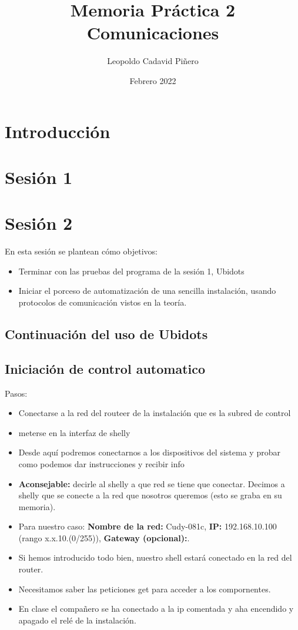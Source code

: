 \documentclass[12pt, a4paper]{article}
\title{Memoria Práctica 2 \\


\large Comunicaciones
}
\author{
Leopoldo Cadavid Piñero
}
\date{Febrero 2022}
\begin{document}
\maketitle
\newpage
\tableofcontents
\newpage
\section{Introducción}
      

\section{Sesión 1}

\section{Sesión 2}
 En esta sesión se plantean cómo objetivos:
 \begin{itemize}
     \item Terminar con las pruebas del programa de la sesión 1, Ubidots
     \item Iniciar el porceso de automatización de una sencilla instalación, usando protocolos de 
        comunicación vistos en la teoría.
    
    
    \end{itemize}

    \subsection{Continuación del uso de Ubidots}

\subsection{Iniciación de control automatico}

Pasos:
\begin{itemize}
    \item Conectarse a la red del routeer de la instalación que es la subred de control
    \item meterse en la  interfaz de shelly
    \item Desde aquí podremos conectarnos a los dispositivos del sistema y probar como podemos dar instrucciones y recibir info
    \item \textbf{Aconsejable:} decirle al shelly a que red se tiene que conectar. Decimos a shelly que se conecte a la red que nosotros queremos
    (esto se graba en su memoria).
    \item Para nuestro caso: \textbf{Nombre de la red:} Cudy-081c, \textbf{IP:} 192.168.10.100 (rango x.x.10.(0/255)), 
    \textbf{Gateway (opcional):}. 
    \item Si hemos introducido todo bien, nuestro shell estará conectado en la red del router.
    \item Necesitamos saber las peticiones get para acceder a los compornentes.
    \item En clase el compañero se ha conectado a la ip comentada y aha encendido y apagado el relé de la instalación.
    

\end{itemize}
\end{document}
